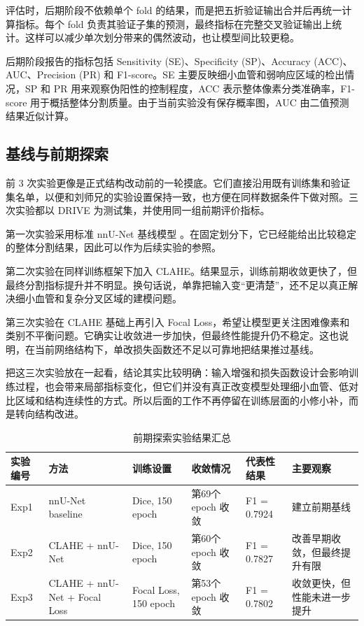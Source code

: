 \documentclass[a4paper,12pt]{article}
\begin{document}
评估时，后期阶段不依赖单个 fold 的结果，而是把五折验证输出合并后再统一计算指标。每个 fold 负责其验证子集的预测，最终指标在完整交叉验证输出上统计。这样可以减少单次划分带来的偶然波动，也让模型间比较更稳。

后期阶段报告的指标包括 Sensitivity (SE)、Specificity (SP)、Accuracy (ACC)、AUC、Precision (PR) 和 F1-score。SE 主要反映细小血管和弱响应区域的检出情况，SP 和 PR 用来观察伪阳性的控制程度，ACC 表示整体像素分类准确率，F1-score 用于概括整体分割质量。由于当前实验没有保存概率图，AUC 由二值预测结果近似计算。

\subsection{基线与前期探索}

前 3 次实验更像是正式结构改动前的一轮摸底。它们直接沿用既有训练集和验证集名单，以便和刘师兄的实验设置保持一致，也方便在同样数据条件下做对照。三次实验都以 DRIVE 为测试集，并使用同一组前期评价指标。

第一次实验采用标准 nnU-Net 基线模型 \cite{isensee2021nnunet}。在固定划分下，它已经能给出比较稳定的整体分割结果，因此可以作为后续实验的参照。

第二次实验在同样训练框架下加入 CLAHE。结果显示，训练前期收敛更快了，但最终分割指标提升并不明显。换句话说，单靠把输入变“更清楚”，还不足以真正解决细小血管和复杂分叉区域的建模问题。

第三次实验在 CLAHE 基础上再引入 Focal Loss，希望让模型更关注困难像素和类别不平衡问题。它确实让收敛进一步加快，但最终性能提升仍不稳定。这也说明，在当前网络结构下，单改损失函数还不足以可靠地把结果推过基线。

把这三次实验放在一起看，结论其实比较明确：输入增强和损失函数设计会影响训练过程，也会带来局部指标变化，但它们并没有真正改变模型处理细小血管、低对比区域和结构连续性的方式。所以后面的工作不再停留在训练层面的小修小补，而是转向结构改进。

\begin{table}[htbp]
\centering
\caption{前期探索实验结果汇总}
\label{tab:early_experiments}
\begin{tabular}{llllll}
\hline
实验编号 & 方法 & 训练设置 & 收敛情况 & 代表性结果 & 主要观察 \\
\hline
Exp1 & nnU-Net baseline & Dice, 150 epoch & 第69个 epoch 收敛 & F1 = 0.7924 & 建立前期基线 \\
Exp2 & CLAHE + nnU-Net & Dice, 150 epoch & 第60个 epoch 收敛 & F1 = 0.7827 & 改善早期收敛，但最终提升有限 \\
Exp3 & CLAHE + nnU-Net + Focal Loss & Focal Loss, 150 epoch & 第53个 epoch 收敛 & F1 = 0.7802 & 收敛更快，但性能未进一步提升 \\
\hline
\end{tabular}
\end{table}
\end{document}
